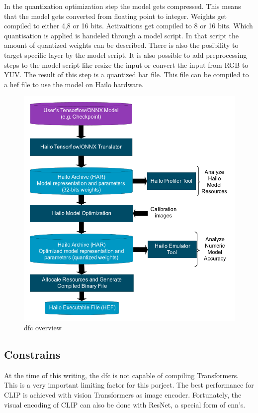 In the quantization optimization step the model gets compressed.
This means that the model gets converted from floating point to integer.
Weights get compiled to either 4,8 or 16 bits.
Activaitions get compiled to 8 or 16 bits.
Which quantisation is applied is handeled through a model script.
In that script the amount of quantized weights can be described.
There is also the posibility to target specific layer by the model script.
It is also possible to add preprocessing steps to the model script like resize the input or convert the input from RGB to YUV.
The result of this step is a quantized \acrshort{har} file.
This file can be compiled to a \acrshort{hef} file to use the model on Hailo hardware.

\begin{figure}[!h]
    \centering
    \includegraphics[width=\textwidth]{Images/Hardware/model_build_overview_with_onnx_and_hef_w_har.png}
    \caption{\Acrlong{dfc} overview \cite{hailo_dataflow_compiler}}
    \label{fig:hardware:dfcoverview}
\end{figure}

\subsection{Constrains}
At the time of this writing, the \acrshort{dfc} is not capable of compiling Transformers.
This is a very important limiting factor for this porject.
The best performance for CLIP is achieved with vision Transformers as image encoder.
Fortunately, the visual encoding of CLIP can also be done with ResNet, a special form of \Acrshort{cnn}'s.

